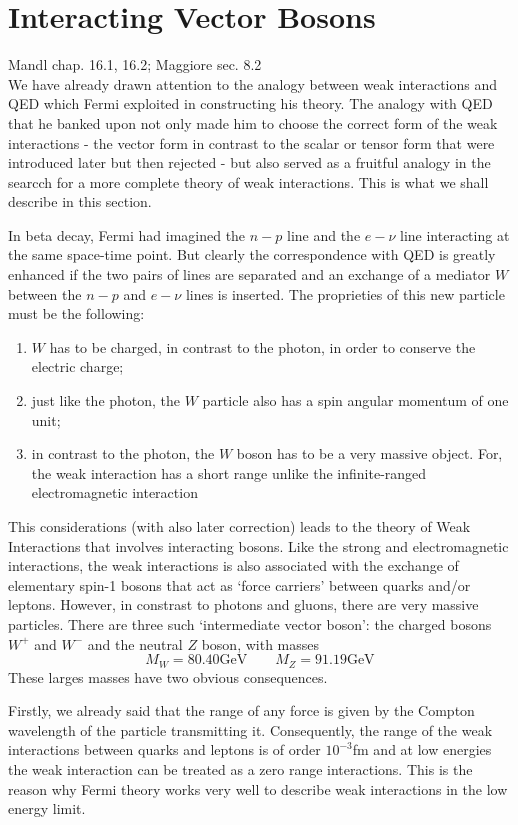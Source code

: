 \documentclass[TheoreticalPhy_ModB.tex]{subfiles}
\begin{document}
\section{Interacting Vector Bosons}
\textsf{Mandl chap. 16.1, 16.2; Maggiore sec. 8.2}\\

We have already drawn attention to the analogy between weak interactions and QED which Fermi exploited in constructing his theory. The analogy with QED that he banked upon not only made him to choose the correct form of the weak interactions - the vector form in contrast to the scalar or tensor form that were introduced later but then rejected - but also served as a fruitful analogy in the searcch for a more complete theory of weak interactions. This is what we shall describe in this section. 

In beta decay, Fermi had imagined the $n-p$ line and the $e-\nu$ line interacting at the same space-time point. But clearly the correspondence with QED is greatly enhanced if the two pairs of lines are separated and an exchange of a mediator $W$ between the $n-p$ and $e-\nu$ lines is inserted. The proprieties of this new particle must be the following:
\begin{enumerate}
\item $W$ has to be charged, in contrast to the photon, in order to conserve the electric charge;
\item just like the photon, the $W$ particle also has a spin angular momentum of one unit;
\item in contrast to the photon, the $W$ boson has to be a very massive object. For, the weak interaction has a short range unlike the infinite-ranged electromagnetic interaction
\end{enumerate}

This considerations (with also later correction) leads to the theory of Weak Interactions that involves interacting bosons. Like the strong and electromagnetic interactions, the weak interactions is also associated with the exchange of elementary spin-1 bosons that act as `force carriers' between quarks and/or leptons. However, in constrast to photons and gluons, there are very massive particles. There are three such `intermediate vector boson': the charged bosons $W^+$ and $W^-$ and the neutral $Z$ boson, with masses
\[M_W=80.40\text{GeV}\qquad M_Z=91.19\text{GeV}\]
These larges masses have two obvious consequences. 

Firstly, we already said that the range of any force is given by the Compton wavelength of the particle transmitting it. Consequently, the range of the weak interactions between quarks and leptons is of order $10^{-3}$fm and at low energies the weak interaction can be treated as a zero range interactions. This is the reason why Fermi theory works very well to describe weak interactions in the low energy limit. 
\end{document}
